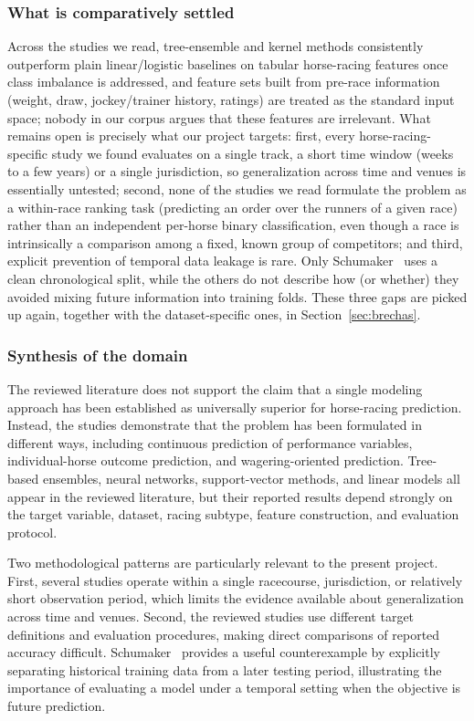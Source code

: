 \subsubsection*{\textbf{What is comparatively settled}} Across the studies we read, tree-ensemble
and kernel methods consistently outperform plain linear/logistic baselines on
tabular horse-racing features once class imbalance is addressed, and feature sets
built from pre-race information (weight, draw, jockey/trainer history, ratings)
are treated as the standard input space; nobody in our corpus argues that these
features are irrelevant. What remains open is precisely what our project
targets: first, every horse-racing-specific study we found evaluates on a single
track, a short time window (weeks to a few years) or a single jurisdiction, so
generalization across time and venues is essentially untested; second, none of the
studies we read formulate the problem as a within-race ranking task (predicting an
order over the runners of a given race) rather than an independent per-horse
binary classification, even though a race is intrinsically a comparison among a
fixed, known group of competitors; and third, explicit prevention of temporal data
leakage is rare. Only Schumaker~\cite{ejeA_schumaker2018} uses a clean
chronological split, while the others do not describe how (or whether) they
avoided mixing future information into training folds. These three gaps are
picked up again, together with the dataset-specific ones, in
Section~\ref{sec:brechas}.

\subsubsection*{\textbf{Synthesis of the domain}} The reviewed literature does not
support the claim that a single modeling approach has been established as universally
superior for horse-racing prediction. Instead, the studies demonstrate that the problem
has been formulated in different ways, including continuous prediction of performance
variables, individual-horse outcome prediction, and wagering-oriented prediction.
Tree-based ensembles, neural networks, support-vector methods, and linear models
all appear in the reviewed literature, but their reported results depend strongly
on the target variable, dataset, racing subtype, feature construction, and
evaluation protocol.

Two methodological patterns are particularly relevant to the present project.
First, several studies operate within a single racecourse, jurisdiction, or
relatively short observation period, which limits the evidence available about
generalization across time and venues. Second, the reviewed studies use different
target definitions and evaluation procedures, making direct comparisons of reported
accuracy difficult. Schumaker~\cite{ejeA_schumaker2018} provides a useful
counterexample by explicitly separating historical training data from a later
testing period, illustrating the importance of evaluating a model under a temporal
setting when the objective is future prediction.

